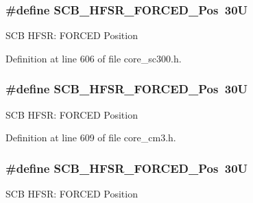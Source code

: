 \subsubsection[{\texorpdfstring{S\+C\+B\+\_\+\+H\+F\+S\+R\+\_\+\+F\+O\+R\+C\+E\+D\+\_\+\+Pos}{SCB_HFSR_FORCED_Pos}}]{\setlength{\rightskip}{0pt plus 5cm}\#define S\+C\+B\+\_\+\+H\+F\+S\+R\+\_\+\+F\+O\+R\+C\+E\+D\+\_\+\+Pos~30U}\hypertarget{group___c_m_s_i_s___s_c_b_gab361e54183a378474cb419ae2a55d6f4}{}\label{group___c_m_s_i_s___s_c_b_gab361e54183a378474cb419ae2a55d6f4}
S\+CB H\+F\+SR\+: F\+O\+R\+C\+ED Position 

Definition at line 606 of file core\+\_\+sc300.\+h.

\subsubsection[{\texorpdfstring{S\+C\+B\+\_\+\+H\+F\+S\+R\+\_\+\+F\+O\+R\+C\+E\+D\+\_\+\+Pos}{SCB_HFSR_FORCED_Pos}}]{\setlength{\rightskip}{0pt plus 5cm}\#define S\+C\+B\+\_\+\+H\+F\+S\+R\+\_\+\+F\+O\+R\+C\+E\+D\+\_\+\+Pos~30U}\hypertarget{group___c_m_s_i_s___s_c_b_gab361e54183a378474cb419ae2a55d6f4}{}\label{group___c_m_s_i_s___s_c_b_gab361e54183a378474cb419ae2a55d6f4}
S\+CB H\+F\+SR\+: F\+O\+R\+C\+ED Position 

Definition at line 609 of file core\+\_\+cm3.\+h.

\subsubsection[{\texorpdfstring{S\+C\+B\+\_\+\+H\+F\+S\+R\+\_\+\+F\+O\+R\+C\+E\+D\+\_\+\+Pos}{SCB_HFSR_FORCED_Pos}}]{\setlength{\rightskip}{0pt plus 5cm}\#define S\+C\+B\+\_\+\+H\+F\+S\+R\+\_\+\+F\+O\+R\+C\+E\+D\+\_\+\+Pos~30U}\hypertarget{group___c_m_s_i_s___s_c_b_gab361e54183a378474cb419ae2a55d6f4}{}\label{group___c_m_s_i_s___s_c_b_gab361e54183a378474cb419ae2a55d6f4}
S\+CB H\+F\+SR\+: F\+O\+R\+C\+ED Position 

